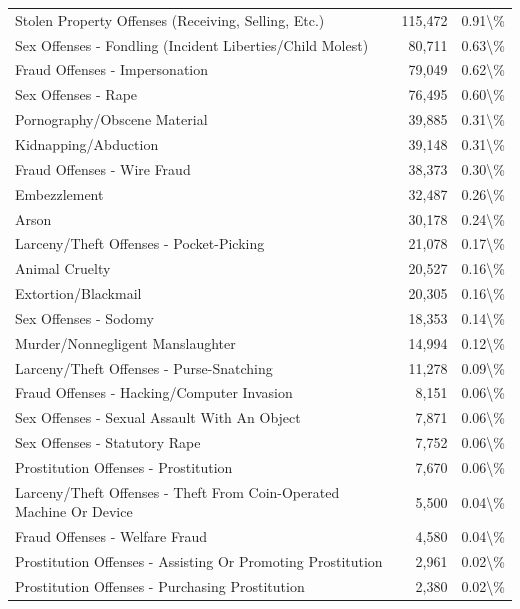 \documentclass[
  12pt,
  openany]{book}
\begin{document}
\begin{longtable}[t]{lrr}
Stolen Property Offenses (Receiving, Selling, Etc.) & 115,472 & 0.91\textbackslash{}\%\\
\addlinespace
Sex Offenses - Fondling (Incident Liberties/Child Molest) & 80,711 & 0.63\textbackslash{}\%\\
Fraud Offenses - Impersonation & 79,049 & 0.62\textbackslash{}\%\\
Sex Offenses - Rape & 76,495 & 0.60\textbackslash{}\%\\
Pornography/Obscene Material & 39,885 & 0.31\textbackslash{}\%\\
Kidnapping/Abduction & 39,148 & 0.31\textbackslash{}\%\\
\addlinespace
Fraud Offenses - Wire Fraud & 38,373 & 0.30\textbackslash{}\%\\
Embezzlement & 32,487 & 0.26\textbackslash{}\%\\
Arson & 30,178 & 0.24\textbackslash{}\%\\
Larceny/Theft Offenses - Pocket-Picking & 21,078 & 0.17\textbackslash{}\%\\
Animal Cruelty & 20,527 & 0.16\textbackslash{}\%\\
\addlinespace
Extortion/Blackmail & 20,305 & 0.16\textbackslash{}\%\\
Sex Offenses - Sodomy & 18,353 & 0.14\textbackslash{}\%\\
Murder/Nonnegligent Manslaughter & 14,994 & 0.12\textbackslash{}\%\\
Larceny/Theft Offenses - Purse-Snatching & 11,278 & 0.09\textbackslash{}\%\\
Fraud Offenses - Hacking/Computer Invasion & 8,151 & 0.06\textbackslash{}\%\\
\addlinespace
Sex Offenses - Sexual Assault With An Object & 7,871 & 0.06\textbackslash{}\%\\
Sex Offenses - Statutory Rape & 7,752 & 0.06\textbackslash{}\%\\
Prostitution Offenses - Prostitution & 7,670 & 0.06\textbackslash{}\%\\
Larceny/Theft Offenses - Theft From Coin-Operated Machine Or Device & 5,500 & 0.04\textbackslash{}\%\\
Fraud Offenses - Welfare Fraud & 4,580 & 0.04\textbackslash{}\%\\
\addlinespace
Prostitution Offenses - Assisting Or Promoting Prostitution & 2,961 & 0.02\textbackslash{}\%\\
Prostitution Offenses - Purchasing Prostitution & 2,380 & 0.02\textbackslash{}\%\\

\end{longtable}
\end{document}
